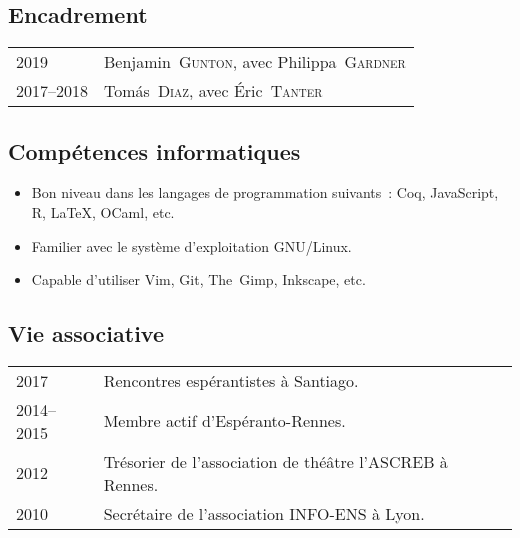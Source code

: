 \documentclass[12pt,a4paper]{article}
\makeatletter
\newenvironment{datecvsection}[1]%
               {\subsection*{#1}%
                 \noindent \begin{tabular}{@{}p{\annee}p{\texte}@{}}}
               {\end{tabular}}
\newenvironment{itemcvsection}[1]%
               {\subsection*{#1}\begin{itemize}}
               {\end{itemize}}
\newcommand\familyName{\textsc}
\newcommand\placeName{}
\makeatother
\begin{document}
\begin{datecvsection}{Encadrement}

    2019 & Benjamin~\familyName{Gunton}, avec Philippa~\familyName{Gardner} \\
    2017–2018 & Tomás~\familyName{Diaz}, avec Éric~\familyName{Tanter} \\

\end{datecvsection}

\begin{itemcvsection}{Compétences informatiques}

  \item Bon niveau dans les langages de programmation suivants~:  Coq, JavaScript, R, \LaTeX, OCaml, etc.
  \item Familier avec le système d’exploitation GNU/Linux.
  \item Capable d’utiliser Vim, Git, The~Gimp, Inkscape, etc.

\end{itemcvsection}

\begin{datecvsection}{Vie associative}

    2017 & Rencontres espérantistes à \placeName{Santiago}. \\
    2014–2015 & Membre actif d’{Espéranto-Rennes}. \\
	2012 & Trésorier de l’association de théâtre l’{ASCREB} à \placeName{Rennes}. \\
    2010 & Secrétaire de l’association \textsc{INFO-ENS} à \placeName{Lyon}. \\

\end{datecvsection}
\end{document}
